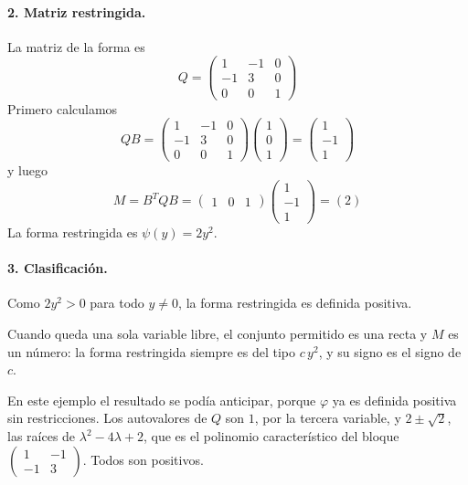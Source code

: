 \documentclass{article}
\begin{document}
\paragraph*{2. Matriz restringida.}
La matriz de la forma es
\[
Q=
\begin{pmatrix}
1 & -1 & 0\\
-1 & 3 & 0\\
0 & 0 & 1
\end{pmatrix}
\]
Primero calculamos
\[
QB=
\begin{pmatrix}
1 & -1 & 0\\
-1 & 3 & 0\\
0 & 0 & 1
\end{pmatrix}
\begin{pmatrix}
1\\
0\\
1
\end{pmatrix}
=
\begin{pmatrix}
1\\
-1\\
1
\end{pmatrix}
\]
y luego
\[
M=B^TQB=
\begin{pmatrix}
1 & 0 & 1
\end{pmatrix}
\begin{pmatrix}
1\\
-1\\
1
\end{pmatrix}
=(2)
\]
La forma restringida es \(\psi(y)=2y^2\).

\paragraph*{3. Clasificación.}
Como \(2y^2>0\) para todo \(y\neq0\), la forma restringida es definida positiva.

Cuando queda una sola variable libre, el conjunto permitido es una recta y \(M\) es un número: la forma restringida siempre es del tipo \(c\,y^2\), y su signo es el signo de \(c\).

En este ejemplo el resultado se podía anticipar, porque \(\varphi\) ya es definida positiva sin restricciones. Los autovalores de \(Q\) son \(1\), por la tercera variable, y \(2\pm\sqrt{2}\), las raíces de \(\lambda^2-4\lambda+2\), que es el polinomio característico del bloque \(\left(\begin{smallmatrix}1&-1\\-1&3\end{smallmatrix}\right)\). Todos son positivos.
\end{document}

